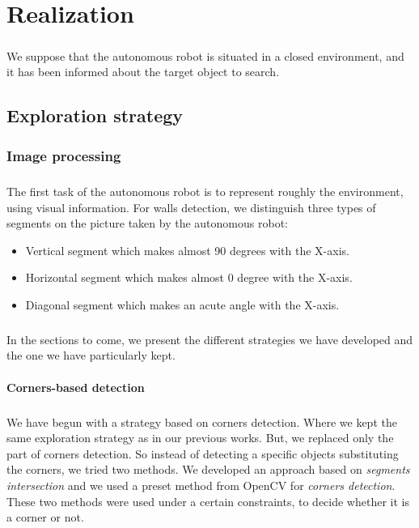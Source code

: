 \documentclass[12pt]{report}
\begin{document}
    \chapter{Realization}
    \paragraph{}
    We suppose that the autonomous robot is situated in a closed environment, and it has been informed about the target object to search. 
	\section{Exploration strategy}
	 \subsection{Image processing}
	 \paragraph{}
	 The first task of the autonomous robot is to represent roughly the environment, using visual information. For walls detection, we distinguish three types of segments on the picture taken by the autonomous robot:
	 \begin{itemize}
	 	\item Vertical segment which makes almost 90 degrees with the X-axis.
	 	\item Horizontal segment which makes almost 0 degree with the  X-axis.
	 	\item Diagonal segment which makes an acute angle with the X-axis.
	 \end{itemize} 
	 
	 
	 \paragraph{}
	 In the sections to come, we present the different strategies we have developed and the one we have particularly kept.
	 
	 \subsubsection{Corners-based detection}
	 \paragraph{}
	 We have begun with a strategy based on corners detection. Where we kept the same exploration strategy as in our previous works. But, we replaced only the part of corners detection. So instead of detecting a specific objects substituting the corners, we tried two methods. We developed an approach based on \textit{segments intersection} and we used a preset method from OpenCV for \textit{corners detection}. These two methods were used under a certain constraints, to decide whether it is a corner or not.
\end{document}
